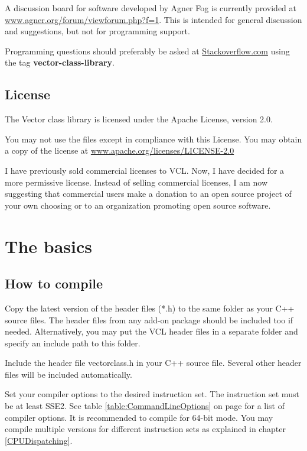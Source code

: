 \documentclass[vcl_manual.tex]{subfiles}
\begin{document}
A discussion board for software developed by Agner Fog is currently provided at
\href{https://www.agner.org/forum/viewforum.php?f=1}{www.agner.org/forum/viewforum.php?f=1}. This is intended for general discussion and suggestions, but not for programming support. 

Programming questions should preferably be asked at 
\href{https://stackoverflow.com}{Stackoverflow.com} using the tag {\bfseries vector-class-library}{\normalfont .} %


\section{License}\label{License}
The Vector class library is licensed under the Apache License, version 2.0.

You may not use the files except in compliance with this License.
You may obtain a copy of the license at
\href{https://www.apache.org/licenses/LICENSE-2.0}{www.apache.org/licenses/LICENSE-2.0}

I have previously sold commercial licenses to VCL. Now, I have decided for a more permissive license. Instead of selling commercial licenses, I am now suggesting that commercial users make a donation to an open source project of your own choosing or to an organization promoting open source software.


\chapter{The basics}\label{chap:TheBasics}
\section{How to compile} \label{HowToCompile}

Copy the latest version of the header files (*.h) to the same folder as your C++ source files. The header files from any add-on package should be included too if needed. Alternatively, you may put the VCL header files in a separate folder and specify an include path to this folder.

Include the header file vectorclass.h in your C++ source file.
Several other header files will be included automatically.

Set your compiler options to the desired instruction set. The instruction set must be at least SSE2. See table \ref{table:CommandLineOptions} on page \pageref{table:CommandLineOptions} for a list of compiler options. It is recommended to compile for 64-bit mode.
You may compile multiple versions for different instruction sets as explained in chapter \ref{CPUDispatching}.
\end{document}
